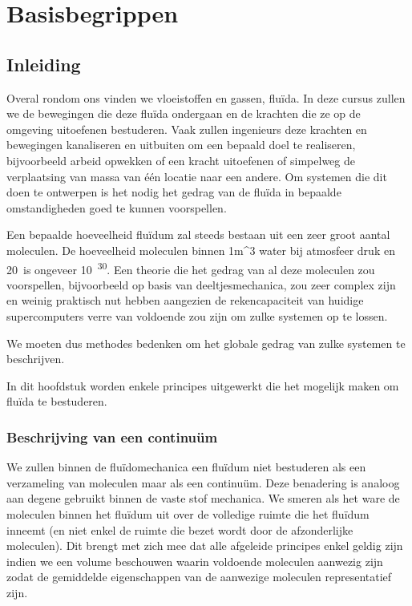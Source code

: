 \chapter{Basisbegrippen}
\label{sec:Basisbegrippen}

	\section{Inleiding}
	\label{sec:Basisbegrippen Inleiding}
Overal rondom ons vinden we vloeistoffen en gassen, fluïda. In deze cursus zullen we de bewegingen die deze fluïda ondergaan en de krachten die ze op de omgeving uitoefenen bestuderen. Vaak zullen ingenieurs deze krachten en bewegingen kanaliseren en uitbuiten om een bepaald doel te realiseren, bijvoorbeeld arbeid opwekken of een kracht uitoefenen of simpelweg de verplaatsing van massa van één locatie naar een andere. Om systemen die dit doen te ontwerpen is het nodig het gedrag van de fluïda in bepaalde omstandigheden goed te kunnen voorspellen.

Een bepaalde hoeveelheid fluïdum zal steeds bestaan uit een zeer groot aantal moleculen. De hoeveelheid moleculen binnen \unit{1}{m^3} water bij atmosfeer druk en 20\textcelsius\ is ongeveer \unit{10^{30}}{}. Een theorie die het gedrag van al deze moleculen zou voorspellen, bijvoorbeeld op basis van deeltjesmechanica, zou zeer complex zijn en weinig praktisch nut hebben aangezien de rekencapaciteit van huidige supercomputers verre van voldoende zou zijn om zulke systemen op te lossen.

We moeten dus methodes bedenken om het globale gedrag van zulke systemen te beschrijven.

In dit hoofdstuk worden enkele principes uitgewerkt die het mogelijk maken om fluïda te bestuderen.
	
	\subsection{Beschrijving van een continuüm}
	\label{sec:Beschrijving van een continuum}	
We zullen binnen de fluïdomechanica een fluïdum niet bestuderen als een verzameling van moleculen maar als een continuüm. Deze benadering is analoog aan degene gebruikt binnen de vaste stof mechanica. We smeren als het ware de moleculen binnen het fluïdum uit over de volledige ruimte die het fluïdum inneemt (en niet enkel de ruimte die bezet wordt door de afzonderlijke moleculen). Dit brengt met zich mee dat alle afgeleide principes enkel geldig zijn indien we een volume beschouwen waarin voldoende moleculen aanwezig zijn zodat de gemiddelde eigenschappen van de aanwezige moleculen representatief zijn.

